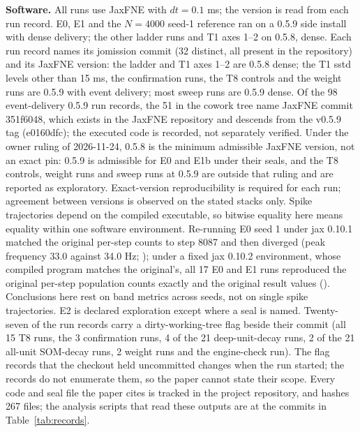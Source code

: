 \textbf{Software.} All runs use JaxFNE with $dt = 0.1$ ms; the version is read from each run record. E0, E1 and the
$N = 4000$ seed-1 reference ran on a 0.5.9 side install with dense delivery; the other ladder runs and T1 axes 1--2
on 0.5.8, dense. Each run record names its jomission commit (32 distinct, all present in the repository) and its JaxFNE version: the ladder and T1 axes 1--2 are 0.5.8 dense; the T1 sstd levels other than 15 ms, the confirmation runs, the T8 controls and the weight runs are 0.5.9 with event delivery; most sweep runs are 0.5.9 dense. Of the 98 event-delivery 0.5.9 run records, the 51 in the cowork tree name JaxFNE commit 351f6048, which exists in the JaxFNE repository and descends from the v0.5.9 tag (e0160dfc); the executed code is recorded, not separately verified. Under the owner ruling of 2026-11-24, 0.5.8 is the minimum admissible JaxFNE version, not an exact pin: 0.5.9 is admissible for E0 and E1b under their seals, and the T8 controls, weight runs and sweep runs at 0.5.9 are outside that ruling and are reported as exploratory.
Exact-version reproducibility is required for each run; agreement between versions is observed on the stated stacks only. Spike trajectories depend on the compiled executable, so bitwise equality here means
equality within one software environment. Re-running E0 seed 1 under jax 0.10.1 matched the original per-step
counts to step 8087 and then diverged (peak frequency 33.0 against 34.0 Hz; ); under a fixed jax 0.10.2 environment,
whose compiled program matches the original's, all 17 E0 and E1 runs reproduced the original per-step population
counts exactly and the original result values (). Conclusions here rest on band metrics across seeds, not on single
spike trajectories. E2 is declared exploration except where a seal is named.
Twenty-seven of the run records carry a dirty-working-tree flag beside their commit (all 15 T8 runs, the 3
confirmation runs, 4 of the 21 deep-unit-decay runs, 2 of the 21 all-unit SOM-decay runs, 2 weight runs and the
engine-check run). The flag records that the checkout held
uncommitted changes when the run started; the records do not enumerate them, so the paper cannot state their scope.
Every code and seal file the paper cites is tracked in the project repository, and  hashes 267 files; the analysis scripts that read these outputs are
at the commits in Table~\ref{tab:records}.

